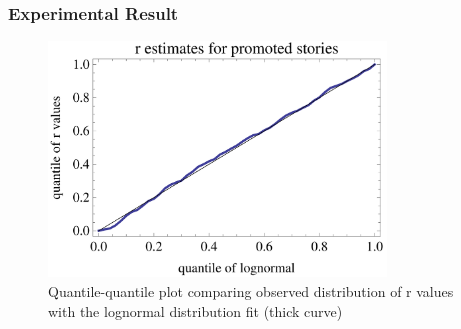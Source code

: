 \documentclass[aspectratio=43]{beamer}
\begin{document}
\begin{frame}
\frametitle{Experimental Result}
\begin{minipage}{\textwidth}
\begin{figure}
\centering
\includegraphics[width=0.8\textwidth]{fig04.PNG}
\caption{Quantile-quantile plot comparing observed distribution of r values with the lognormal distribution fit (thick curve)}
\end{figure}
\end{minipage}
\end{frame}
\end{document}
